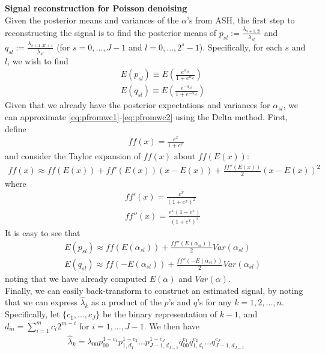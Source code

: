 \documentclass[12pt]{article}
\newcommand{\Ga}{\alpha}
\newcommand{\Gl}{\lambda}    \newcommand{\GL}{\Lambda}
\begin{document}
\begin{appendices}
\section{}\label{app:reconstruction}\bigskip
\textbf{Signal reconstruction for Poisson denoising}\bigskip\\
Given the posterior means and variances of the $\Ga$'s from ASH, the first step to reconstructing the signal is to find the posterior means of $p_{sl}:=\frac{\Gl_{s+1,2l}}{\Gl_{sl}}$ and $q_{sl}:=\frac{\Gl_{s+1,2l+1}}{\Gl_{sl}}$ (for $s=0,...,J-1$ and $l=0,...,2^s-1$). Specifically, for each $s$ and $l$, we wish to find
\begin{eqnarray}\label{eq:pfromwc1}
&&E(p_{sl})\equiv E\left(\frac{e^{\Ga_{sl}}}{1+e^{\Ga_{sl}}}\right)\\
\label{eq:pfromwc2}&&E(q_{sl})\equiv E\left(\frac{e^{-\Ga_{sl}}}{1+e^{-\Ga_{sl}}}\right)\end{eqnarray}
Given that we already have the posterior expectations and variances for $\Ga_{sl}$, we can approximate \eqref{eq:pfromwc1}-\eqref{eq:pfromwc2} using the Delta method. First, define 
\begin{eqnarray}\label{eq:ff}ff(x)=\frac{e^x}{1+e^x}\end{eqnarray}
and consider the Taylor expansion of $ff(x)$ about $ff(E(x))$:
\begin{eqnarray}\label{eq:delta}ff(x)\approx ff(E(x))+ff'(E(x))(x-E(x))+\frac{ff''(E(x))}{2}(x-E(x))^2\end{eqnarray}
where
\begin{eqnarray}
\label{eq:fderiv}&&ff'(x)=\frac{e^x}{(1+e^x)^2}\\
\label{eq:sderiv}&&ff''(x)=\frac{e^x(1-e^{x})}{(1+e^x)^3}
\end{eqnarray}
It is easy to see that
\begin{eqnarray}
&&E(p_{sl})\approx ff(E(\Ga_{sl}))+\frac{ff''(E(\Ga_{sl}))}{2}Var(\Ga_{sl})\\
\label{eq:Ep}&&E(q_{sl})\approx ff(-E(\Ga_{sl}))+\frac{ff''(-E(\Ga_{sl}))}{2}Var(\Ga_{sl})
\end{eqnarray}
noting that we have already computed $E(\Ga)$ and $Var(\Ga)$.\bigskip\\
Finally, we can easily back-transform to construct an estimated signal, by noting that we can express $\hat{\Gl}_k$ as a product of the $p$'s and $q$'s for any $k=1,2,...,n$. Specifically, let $\{c_1,...,c_J\}$ be the binary representation of $k-1$, and $d_m=\sum_{i=1}^m c_i2^{m-i}$ for $i=1,...,J-1$. We then have
\begin{eqnarray}\label{eq:product}\hat{\Gl}_k=\Gl_{00}p_{00}^{1-c_1}p_{1,d_1}^{1-c_2}...p_{J-1,d_{J-1}}^{1-c_J}q_{00}^{c_1}q_{1,d_1}^{c_2}...q_{J-1,d_{J-1}}^{c_J}\end{eqnarray}

\end{appendices}
\end{document}
